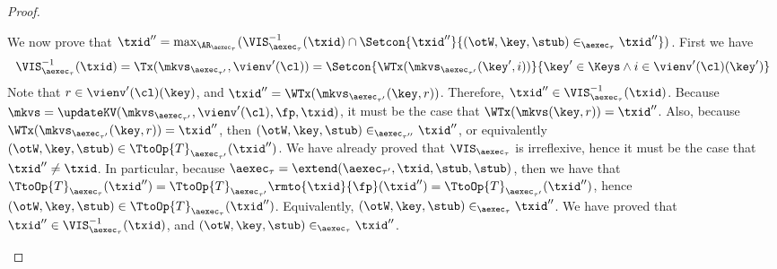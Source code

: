 \begin{proof}
\begin{itemize}
\begin{itemize}
We now prove that 
$\txid'' = \max_{\AR_{\aexec_{\tau}}}(\VIS^{-1}_{\aexec_{\tau}}(\txid) \cap \Setcon{ \txid'' }{ (\otW, \key, \stub) \in_{\aexec_{\tau}} \txid''})$. 
First we have
\[ 
\begin{array}{l}
\VIS^{-1}_{\aexec_{\tau}}(\txid) = 
\Tx(\mkvs_{\aexec_{\tau'}}, \vienv'(\cl)) = 
\Setcon{\WTx(\mkvs_{\aexec_{\tau'}}(\key',  i)) }{ \key' \in \Keys \wedge  i \in \vienv'(\cl)(\key')}
\end{array}
\]
Note that $r \in \vienv'(\cl)(\key)$, and $\txid'' = \WTx(\mkvs_{\aexec_{\tau'}}(\key, r))$. 
Therefore, $\txid'' \in \VIS^{-1}_{\aexec_{\tau}}(\txid)$. 
Because $\mkvs = \updateKV(\mkvs_{\aexec_{\tau'}}, \vienv'(\cl), \fp, \txid)$, it 
must be the case that $\WTx(\mkvs(\key, r)) = \txid''$. Also, because $\WTx(\mkvs_{\aexec_{\tau'}}(\key, r)) = \txid''$, 
then $(\otW, \key, \stub) \in_{\aexec_{\tau''}} \txid''$, or equivalently $(\otW, \key, \stub) \in \TtoOp{T}_{\aexec_{\tau'}}(\txid'')$. 
We have already proved that $\VIS_{\aexec_{\tau}}$ is irreflexive, hence it must be the case that $\txid'' \neq \txid$. 
In particular, because $\aexec_{\tau} = \extend(\aexec_{\tau'}, \txid, \stub, \stub)$, then we have that 
$\TtoOp{T}_{\aexec_{\tau}}(\txid'') = \TtoOp{T}_{\aexec_{\tau'}}\rmto{\txid}{\fp}(\txid'') = 
\TtoOp{T}_{\aexec_{\tau'}}(\txid'')$, hence $(\otW, \key, \stub) \in \TtoOp{T}_{\aexec_{\tau}}(\txid'')$. Equivalently, 
$(\otW, \key, \stub) \in_{\aexec_{\tau}} \txid''$. We have proved that $\txid'' \in \VIS^{-1}_{\aexec_{\tau}}(\txid)$, 
and $(\otW, \key, \stub) \in_{\aexec_{\tau}} \txid''$. 


\end{itemize}
\end{itemize}
\end{proof}
